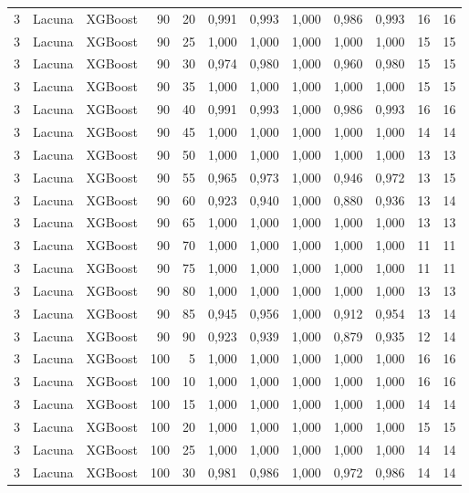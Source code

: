 \begin{longtable}{@{}rllrrrrrrrrr@{}}
3 & Lacuna & XGBoost & 90 & 20 & 0,991 & 0,993 & 1,000 & 0,986 & 0,993 & 16 & 16 \\
3 & Lacuna & XGBoost & 90 & 25 & 1,000 & 1,000 & 1,000 & 1,000 & 1,000 & 15 & 15 \\
3 & Lacuna & XGBoost & 90 & 30 & 0,974 & 0,980 & 1,000 & 0,960 & 0,980 & 15 & 15 \\
3 & Lacuna & XGBoost & 90 & 35 & 1,000 & 1,000 & 1,000 & 1,000 & 1,000 & 15 & 15 \\
3 & Lacuna & XGBoost & 90 & 40 & 0,991 & 0,993 & 1,000 & 0,986 & 0,993 & 16 & 16 \\
3 & Lacuna & XGBoost & 90 & 45 & 1,000 & 1,000 & 1,000 & 1,000 & 1,000 & 14 & 14 \\
3 & Lacuna & XGBoost & 90 & 50 & 1,000 & 1,000 & 1,000 & 1,000 & 1,000 & 13 & 13 \\
3 & Lacuna & XGBoost & 90 & 55 & 0,965 & 0,973 & 1,000 & 0,946 & 0,972 & 13 & 15 \\
3 & Lacuna & XGBoost & 90 & 60 & 0,923 & 0,940 & 1,000 & 0,880 & 0,936 & 13 & 14 \\
3 & Lacuna & XGBoost & 90 & 65 & 1,000 & 1,000 & 1,000 & 1,000 & 1,000 & 13 & 13 \\
3 & Lacuna & XGBoost & 90 & 70 & 1,000 & 1,000 & 1,000 & 1,000 & 1,000 & 11 & 11 \\
3 & Lacuna & XGBoost & 90 & 75 & 1,000 & 1,000 & 1,000 & 1,000 & 1,000 & 11 & 11 \\
3 & Lacuna & XGBoost & 90 & 80 & 1,000 & 1,000 & 1,000 & 1,000 & 1,000 & 13 & 13 \\
3 & Lacuna & XGBoost & 90 & 85 & 0,945 & 0,956 & 1,000 & 0,912 & 0,954 & 13 & 14 \\
3 & Lacuna & XGBoost & 90 & 90 & 0,923 & 0,939 & 1,000 & 0,879 & 0,935 & 12 & 14 \\
3 & Lacuna & XGBoost & 100 & 5 & 1,000 & 1,000 & 1,000 & 1,000 & 1,000 & 16 & 16 \\
3 & Lacuna & XGBoost & 100 & 10 & 1,000 & 1,000 & 1,000 & 1,000 & 1,000 & 16 & 16 \\
3 & Lacuna & XGBoost & 100 & 15 & 1,000 & 1,000 & 1,000 & 1,000 & 1,000 & 14 & 14 \\
3 & Lacuna & XGBoost & 100 & 20 & 1,000 & 1,000 & 1,000 & 1,000 & 1,000 & 15 & 15 \\
3 & Lacuna & XGBoost & 100 & 25 & 1,000 & 1,000 & 1,000 & 1,000 & 1,000 & 14 & 14 \\
3 & Lacuna & XGBoost & 100 & 30 & 0,981 & 0,986 & 1,000 & 0,972 & 0,986 & 14 & 14 \\

\end{longtable}
